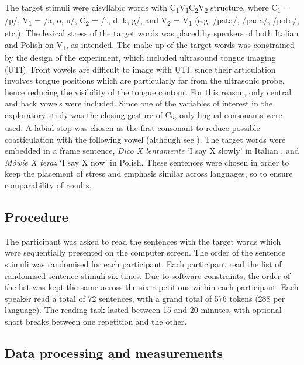 \documentclass[]{JASAnew}
\begin{document}
The target stimuli were disyllabic words with
C\textsubscript{1}V\textsubscript{1}C\textsubscript{2}V\textsubscript{2}
structure, where C\textsubscript{1} = /p/, V\textsubscript{1} = /a, o,
u/, C\textsubscript{2} = /t, d, k, g/, and V\textsubscript{2} =
V\textsubscript{1} (e.g. /pata/, /pada/, /poto/, etc.). The lexical
stress of the target words was placed by speakers of both Italian and
Polish on V\textsubscript{1}, as intended. The make-up of the target
words was constrained by the design of the experiment, which included
ultrasound tongue imaging (UTI). Front vowels are difficult to image
with UTI, since their articulation involves tongue positions which are
particularly far from the ultrasonic probe, hence reducing the
visibility of the tongue contour. For this reason, only central and back
vowels were included. Since one of the variables of interest in the
exploratory study was the closing gesture of C\textsubscript{2}, only
lingual consonants were used. A labial stop was chosen as the first
consonant to reduce possible coarticulation with the following vowel
(although see \citealt{vazquez-alvarez2007}). The target words were
embedded in a frame sentence, \emph{Dico X lentamente} `I say X slowly'
in Italian \citep[following][]{hajek2008}, and \emph{Mówię X teraz} `I
say X now' in Polish. These sentences were chosen in order to keep the
placement of stress and emphasis similar across languages, so to ensure
comparability of results.

\hypertarget{procedure}{%
\subsection{Procedure}\label{procedure}}

The participant was asked to read the sentences with the target words
which were sequentially presented on the computer screen. The order of
the sentence stimuli was randomised for each participant. Each
participant read the list of randomised sentence stimuli six times. Due
to software constraints, the order of the list was kept the same across
the six repetitions within each participant. Each speaker read a total
of 72 sentences, with a grand total of 576 tokens (288 per language).
The reading task lasted between 15 and 20 minutes, with optional short
breaks between one repetition and the other.

\hypertarget{data-processing-and-measurements}{%
\subsection{Data processing and
measurements}\label{data-processing-and-measurements}}
\end{document}
